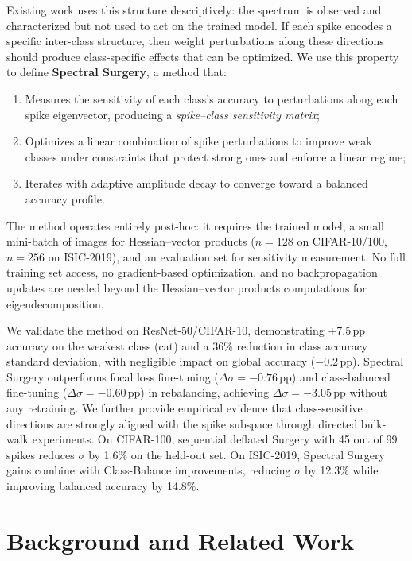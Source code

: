 \documentclass[11pt,a4paper]{article}
\begin{document}
Existing work uses this structure descriptively: the spectrum is
observed and characterized but not used to act on the trained model.
If each spike encodes a specific inter-class structure, then weight
perturbations along these directions should produce class-specific
effects that can be optimized. We use this property to define
\textbf{Spectral Surgery}, a method that:
\begin{enumerate}
    \item Measures the sensitivity of each class's accuracy
      to perturbations along each spike eigenvector, producing a
      \emph{spike--class sensitivity matrix};
    \item Optimizes a linear combination of spike
      perturbations to improve weak classes under constraints that
      protect strong ones and enforce a linear regime;
    \item Iterates with adaptive amplitude decay to converge
      toward a balanced accuracy profile.
\end{enumerate}

The method operates entirely post-hoc: it requires the trained model,
a small mini-batch of images for Hessian--vector products ($n = 128$
on CIFAR-10/100, $n = 256$ on ISIC-2019),
and an evaluation set for sensitivity measurement. No full training set
access, no gradient-based optimization, and no backpropagation updates
are needed beyond the Hessian--vector products computations for eigendecomposition.

We validate the method on ResNet-50/CIFAR-10, demonstrating +7.5\,pp
accuracy on the weakest class (cat) and a 36\% reduction in class
accuracy standard deviation, with negligible impact on global accuracy
($-$0.2\,pp). Spectral Surgery outperforms focal loss fine-tuning
($\Delta\sigma = -0.76$\,pp) and class-balanced fine-tuning
($\Delta\sigma = -0.60$\,pp) in rebalancing, achieving
$\Delta\sigma = -3.05$\,pp without any retraining. We further provide
empirical evidence that class-sensitive directions are strongly aligned
with the spike subspace through directed bulk-walk experiments. On CIFAR-100, sequential deflated Surgery with 45 out of 99 spikes reduces $\sigma$ by 1.6\% on the held-out set.
On ISIC-2019, Spectral Surgery gains combine with Class-Balance improvements, reducing $\sigma$ by 12.3\% while improving balanced accuracy by 14.8\%.

\section{Background and Related Work}
\label{sec:background}
\end{document}
